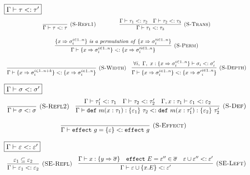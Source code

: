 \documentclass{article}
\newcommand{\keywadj}[1]{\mathtt{#1}}
\newcommand{\keyw}[1]{\keywadj{#1}~}
\begin{document}
\begin{figure}[H]
\footnotesize{


$\fbox{$\Gamma \vdash \tau <: \tau'$}$
\[
\begin{array}{c}
\infer[\textsc{(S-Refl1)}]
  {\Gamma \vdash \tau <:\tau}
  {}%
~~~~~~~~~~\hspace{10pt}
\infer[\textsc{(S-Trans)}]
  {\Gamma \vdash \tau_1 <: \tau_3}
  {\Gamma \vdash \tau_1 <: \tau_2 & \Gamma \vdash \tau_2 <: \tau_3}\\[3ex]

\infer[\textsc{(S-Perm)}]
  {\Gamma \vdash \{ x \Rightarrow \sigma_i^{i \in 1..n} \} <: \{ x \Rightarrow \sigma_i'^{i \in 1..n} \}}
  {\{ x \Rightarrow \sigma_i^{i \in 1..n} \}~\mathit{is~a~permutation~of}~\{ x \Rightarrow \sigma_i'^{i \in 1..n} \}}\\[3ex]
\infer[\textsc{(S-Width)}]
  {\Gamma \vdash \{ x \Rightarrow \sigma_i^{i \in 1..n + k} \} <: \{ x \Rightarrow \sigma_i^{i \in 1..n} \}}
  {} \quad 
\infer[\textsc{(S-Depth)}]
  {\Gamma \vdash \{ x \Rightarrow \sigma_i^{i \in 1..n} \} <: \{ x \Rightarrow {\sigma'}_i^{i \in 1..n} \}}
  {\forall i,~\Gamma,~x : \{ x \Rightarrow {\sigma}_i^{i \in 1..n} \} \vdash \sigma_i <: \sigma_i'}

\end{array}
\]


\noindent$\fbox{$\Gamma \vdash \sigma <: \sigma'$}$
\[
\begin{array}{c}
\infer[\textsc{(S-Refl2)}]
  {\Gamma \vdash \sigma <: \sigma}
  {} \quad
\infer[\textsc{(S-Def)}]
  {\Gamma \vdash \keyw{def} m(x : \tau_1) : \{ \varepsilon_1 \}~\tau_2 <: \keyw{def} m(x : \tau_1') : \{ \varepsilon_2 \}~\tau_2'}
  {\Gamma \vdash \tau_1' <: \tau_1 & \Gamma \vdash \tau_2 <: \tau_2' & \Gamma, x : \tau_1 \vdash \varepsilon_1 <: \varepsilon_2 }\\[3ex]

\infer[\textsc{(S-Effect)}]
  {\Gamma \vdash \keyw{effect} g = \{ \varepsilon \} <: \keyw{effect} g}
  {}\quad
  
  
  
\end{array}
\]


\noindent$\fbox{$\Gamma \vdash \varepsilon <: \varepsilon'$}$
\[
\begin{array}{c}
\infer[\textsc{(SE-Refl)}]
  {\Gamma \vdash \varepsilon_1 <: \varepsilon_2}
  {\varepsilon_1  \subseteq \varepsilon_2} \quad
\infer[\textsc{(SE-Left)}]
  {\Gamma \vdash \varepsilon \cup \{x.E\} <: \varepsilon' }
  {\Gamma \vdash x : \{y \Rightarrow \overline{\sigma}\} & \keyw{effect} E = \varepsilon'' \in \overline{\sigma} & \varepsilon \cup  \varepsilon'' <: \varepsilon'  } \\[3ex]
  

\end{array}\]}
\end{figure}
\end{document}
